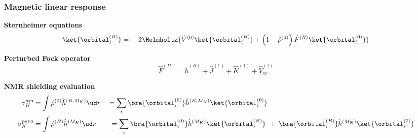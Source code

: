 \begin{frame}
\frametitle{Magnetic linear response}

\centering
\textbf{Sternheimer equations}
\begin{equation}
    \nonumber
    \ket{\orbital_i^{(B)}} =\
    -2\Helmholtz{\hat{V}^{(0)}\ket{\orbital_i^{(B)}}
    + \left(1 - \hat{\rho}^{(0)}\right)\hat{F}^{(B)}\ket{\orbital_i^{(0)}}}
\end{equation}

\vspace{5mm}

\textbf{Perturbed Fock operator}
\begin{equation}
    \nonumber
    \hat{F}^{(B)} = \hat{h}^{(B)} + \hat{J}^{(1)} + \hat{K}^{(1)} +
    \hat{V}_{xc}^{(1)}
\end{equation}

\vspace{10mm}

\pause
\textbf{NMR shielding evaluation}
\begin{align}
    \nonumber
    \sigma_K^{dia} 
    &= \int \hat{\rho}^{(0)}\hat{h}^{(B,M_K)} \ud r \quad
    = \sum_i\bra{\orbital_i^{(0)}}\hat{h}^{(B,M_K)}\ket{\orbital_i^{(0)}} \\
    \nonumber
    \sigma_K^{para} 
    &= \int \hat{\rho}^{(B)}\hat{h}^{(M_K)} \ud r \qquad
    = \sum_i
    \bra{\orbital_i^{(0)}}\hat{h}^{(M_K)}\ket{\orbital_i^{(B)}}\ +\ 
    \bra{\orbital_i^{(B)}}\hat{h}^{(M_K)}\ket{\orbital_i^{(0)}}
\end{align}
\end{frame}

